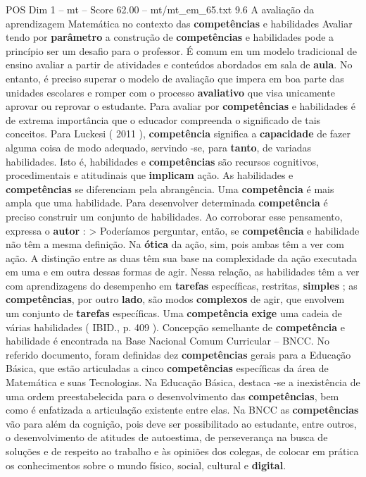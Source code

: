 \begin{textsample}{POS Dim 1 – mt – Score 62.00 – mt/mt\_em\_65.txt}  \label{ex:f1_pos_078}
9.6 A avaliação da aprendizagem Matemática no contexto das \textbf{competências} e habilidades Avaliar tendo por \textbf{parâmetro} a construção de \textbf{competências} e habilidades pode a princípio ser um desafio para o professor.
É comum em um modelo tradicional de ensino avaliar a partir de atividades e conteúdos abordados em sala de \textbf{aula}.
No entanto, é preciso superar o modelo de avaliação que impera em boa parte das unidades escolares e romper com o processo \textbf{avaliativo} que visa unicamente aprovar ou reprovar o estudante.
Para avaliar por \textbf{competências} e habilidades é de extrema importância que o educador compreenda o significado de tais conceitos.
Para Luckesi ( 2011 ), \textbf{competência} significa a \textbf{capacidade} de fazer alguma coisa de modo adequado, servindo -se, para \textbf{tanto}, de variadas habilidades.
Isto é, habilidades e \textbf{competências} são recursos cognitivos, procedimentais e atitudinais que \textbf{implicam} ação.
As habilidades e \textbf{competências} se diferenciam pela abrangência.
Uma \textbf{competência} é mais ampla que uma habilidade.
Para desenvolver determinada \textbf{competência} é preciso construir um conjunto de habilidades.
Ao corroborar esse pensamento, expressa o \textbf{autor} : > Poderíamos perguntar, então, se \textbf{competência} e habilidade não têm a mesma definição.
Na \textbf{ótica} da ação, sim, pois ambas têm a ver com ação.
A distinção entre as duas têm sua base na complexidade da ação executada em uma e em outra dessas formas de agir.
Nessa relação, as habilidades têm a ver com aprendizagens do desempenho em \textbf{tarefas} específicas, restritas, \textbf{simples} ; as \textbf{competências}, por outro \textbf{lado}, são modos \textbf{complexos} de agir, que envolvem um conjunto de \textbf{tarefas} específicas.
Uma \textbf{competência} \textbf{exige} uma cadeia de várias habilidades ( IBID., p. 409 ).
Concepção semelhante de \textbf{competência} e habilidade é encontrada na Base Nacional Comum Curricular – BNCC.
No referido documento, foram definidas dez \textbf{competências} gerais para a Educação Básica, que estão articuladas a cinco \textbf{competências} específicas da área de Matemática e suas Tecnologias.
Na Educação Básica, destaca -se a inexistência de uma ordem preestabelecida para o desenvolvimento das \textbf{competências}, bem como é enfatizada a articulação existente entre elas.
Na BNCC as \textbf{competências} vão para além da cognição, pois deve ser possibilitado ao estudante, entre outros, o desenvolvimento de atitudes de autoestima, de perseverança na busca de soluções e de respeito ao trabalho e às opiniões dos colegas, de colocar em prática os conhecimentos sobre o mundo físico, social, cultural e \textbf{digital}.

\end{textsample}
